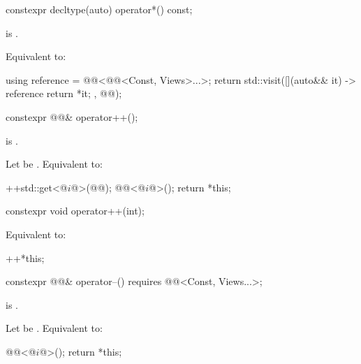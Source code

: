%
\begin{itemdecl}
constexpr decltype(auto) operator*() const;
\end{itemdecl}

\begin{itemdescr}
\pnum
\expects
{} is .

\pnum
\effects
Equivalent to:
\begin{codeblock}
using reference = @@<@@<Const, Views>...>;
return std::visit([](auto&& it) -> reference { return *it; },
                  @@);
\end{codeblock}
\end{itemdescr}

%
\begin{itemdecl}
constexpr @@& operator++();
\end{itemdecl}

\begin{itemdescr}
\pnum
\expects
{} is .

\pnum
\effects
Let  be .
Equivalent to:
\begin{codeblock}
++std::get<@$i$@>(@@);
@@<@$i$@>();
return *this;
\end{codeblock}
\end{itemdescr}

%
\begin{itemdecl}
constexpr void operator++(int);
\end{itemdecl}

\begin{itemdescr}
\pnum
\effects
Equivalent to:
\begin{codeblock}
++*this;
\end{codeblock}
\end{itemdescr}

%
\begin{itemdecl}
constexpr @@& operator--()
  requires @@<Const, Views...>;
\end{itemdecl}

\begin{itemdescr}
\pnum
\expects
{} is .

\pnum
\effects
Let  be .
Equivalent to:
\begin{codeblock}
@@<@$i$@>();
return *this;
\end{codeblock}
\end{itemdescr}

